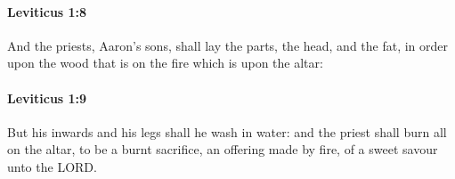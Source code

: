 		\paragraph{Leviticus 1:8} %
			\label{LEVITICUS-1-8}

			And the priests, Aaron’s sons, shall lay the parts, the head, and the fat, in order upon the wood that is on the fire which is upon the altar:


		\paragraph{Leviticus 1:9} %
			\label{LEVITICUS-1-9}

			But his inwards and his legs shall he wash in water: and the priest shall burn all on the altar, to be a burnt sacrifice, an offering made by fire, of a sweet savour unto the LORD.


